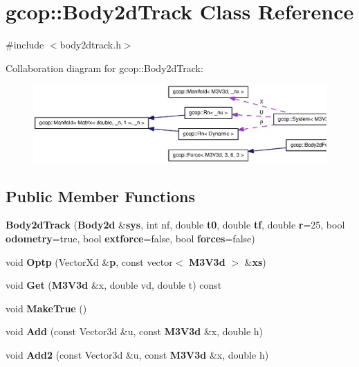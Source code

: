 \section{gcop\-:\-:\-Body2d\-Track \-Class \-Reference}
\label{classgcop_1_1Body2dTrack}


{\ttfamily \#include $<$body2dtrack.\-h$>$}



\-Collaboration diagram for gcop\-:\-:\-Body2d\-Track\-:\nopagebreak
\begin{figure}[H]
\begin{center}
\leavevmode
\includegraphics[width=350pt]{classgcop_1_1Body2dTrack__coll__graph}
\end{center}
\end{figure}
\subsection*{\-Public \-Member \-Functions}
\begin{DoxyCompactItemize}
\item 
{\bf \-Body2d\-Track} ({\bf \-Body2d} \&{\bf sys}, int nf, double {\bf t0}, double {\bf tf}, double {\bf r}=25, bool {\bf odometry}=true, bool {\bf extforce}=false, bool {\bf forces}=false)
\item 
void {\bf \-Optp} (\-Vector\-Xd \&{\bf p}, const vector$<$ {\bf \-M3\-V3d} $>$ \&{\bf xs})
\item 
void {\bf \-Get} ({\bf \-M3\-V3d} \&x, double vd, double t) const 
\item 
void {\bf \-Make\-True} ()
\item 
void {\bf \-Add} (const \-Vector3d \&u, const {\bf \-M3\-V3d} \&x, double h)
\item 
void {\bf \-Add2} (const \-Vector3d \&u, const {\bf \-M3\-V3d} \&x, double h)
\end{DoxyCompactItemize}

